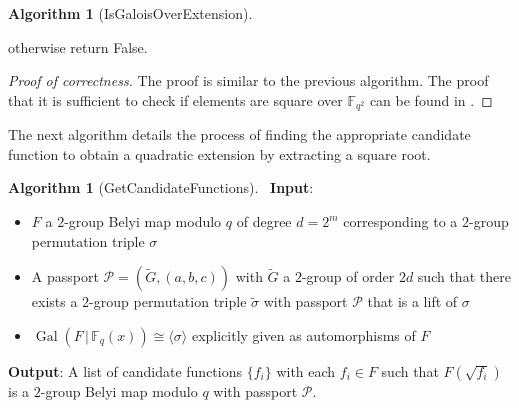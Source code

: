 \documentclass{dcthesis}
\newcommand{\mm}[1]{{\color{blue} \sf MM: [#1]}}
\newcommand{\wt}[1]{\widetilde{#1}}
\newcommand{\FFqal}{{\mathbb F}_q^{\textup{al}}}
\newcommand{\FF}{\mathbb{F}}
\DeclareMathOperator{\Gal}{Gal}
\numberwithin{equation}{section}
\newtheorem{lemma}[equation]{Lemma}
\theoremstyle{definition}
\newtheorem{alg}[equation]{Algorithm}
\theoremstyle{remark}
\begin{document}
{{{\begin{alg}[IsGaloisOverExtension]
\begin{enumerate}
          otherwise return \textsf{False}.
      \end{enumerate}
    \end{alg}
    \begin{proof}[Proof of correctness]
      The proof is similar to the previous
      algorithm.
      The proof that
      it is sufficient to check if
      elements are square
      over $\FF_{q^2}$
      can be found in
      \cite[Corollary 3.7.4]{stick}.
    \end{proof}
    The next algorithm details the process
    of finding
    the appropriate
    candidate function to obtain
    a quadratic extension by extracting
    a square root.
    \begin{alg}[GetCandidateFunctions]
      \label{alg:getcandidates}
      \,
      \newline
      \textbf{Input}:
      \begin{itemize}
        \item 
          $F$
          a $2$-group Belyi map modulo $q$
          of degree $d=2^m$
          corresponding to a $2$-group
          permutation triple $\sigma$
        \item
          A passport
          $\mathcal{P}=(\wt{G},(a,b,c))$
          with $\wt{G}$ a $2$-group of order
          $2d$ such that there
          exists a
          $2$-group permutation triple
          $\wt{\sigma}$ with passport
          $\mathcal{P}$
          that is a lift of
          $\sigma$
        \item
          $\Gal(F\,|\,\FF_q(x))\cong
          \langle\sigma\rangle$
          explicitly given
          as automorphisms of $F$
      \end{itemize}
      \textbf{Output}:
      A list of candidate functions
      $\{f_i\}$ with each $f_i\in F$
      such that $F(\sqrt{f_i})$ is a
      $2$-group Belyi map modulo $q$
      with passport $\mathcal{P}$.

\end{alg}}}}
\end{document}
